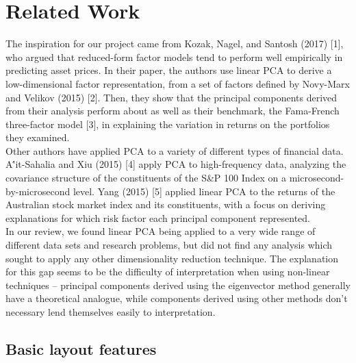 \documentclass[a4paper]{article}
\begin{document}
  
  \section{Related Work}

   The inspiration for our project came from Kozak, Nagel, and Santosh (2017) [1], who argued that reduced-form factor models tend to perform well empirically in predicting asset prices. In their paper, the authors use linear PCA to derive a low-dimensional factor representation, from a set of factors defined by Novy-Marx and Velikov (2015) [2]. Then, they show that the principal components derived from their analysis perform about as well as their benchmark, the Fama-French three-factor model [3], in explaining the variation in returns on the portfolios they examined. \\ Other authors have applied PCA to a variety of different types of financial data. A{\''i}t-Sahalia and Xiu (2015) [4] apply PCA to high-frequency data, analyzing the covariance structure of the constituents of the S\&P 100 Index on a microsecond-by-microsecond level. Yang (2015) [5] applied linear PCA to the returns of the Australian stock market index and its constituents, with a focus on deriving explanations for which risk factor each principal component represented. \\ In our review, we found linear PCA being applied to a very wide range of different data sets and research problems, but did not find any analysis which sought to apply any other dimensionality reduction technique. The explanation for this gap seems to be the difficulty of interpretation when using non-linear techniques -- principal components derived using the eigenvector method generally have a theoretical analogue, while components derived using other methods don't necessary lend themselves easily to interpretation.
   
    \subsection{Basic layout features}
\end{document}

